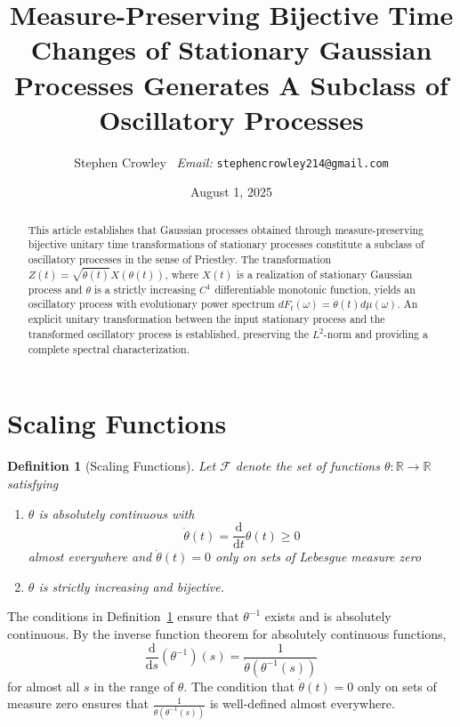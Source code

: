 \documentclass{article}
\newcommand{\mathd}{\mathrm{d}}
\newcommand{\tmemail}[1]{\ \textit{Email:} \texttt{#1}}
\newtheorem{definition}{Definition}
\begin{document}
\title{Measure-Preserving Bijective Time Changes of Stationary Gaussian Processes Generates A Subclass of Oscillatory Processes}
\author{
Stephen Crowley
\tmemail{stephencrowley214@gmail.com}}
\date{August 1, 2025}
\maketitle

\begin{abstract}
This article establishes that Gaussian processes obtained through
measure-preserving bijective unitary time transformations of stationary
processes constitute a subclass of oscillatory processes in the sense of
Priestley{\cite{priestley1965}}. The transformation $Z (t) = \sqrt{\dot{\theta} (t)} X (\theta
(t))$, where $X (t)$ is a realization of stationary Gaussian process and
$\theta$ is a strictly increasing $C^1$ differentiable monotonic function,
yields an oscillatory process with evolutionary power spectrum $dF_t
(\omega) = \dot{\theta} (t) d \mu (\omega)$. An explicit unitary
transformation between the input stationary process and the transformed
oscillatory process is established, preserving the $L^2$-norm and providing
a complete spectral characterization.
\end{abstract}

{\tableofcontents}

\section{Scaling Functions}\label{sec:scaling}

\begin{definition}
[Scaling Functions]\label{def:scaling} Let $\mathcal{F}$ denote the set of
functions $\theta : \mathbb{R} \to \mathbb{R}$ satisfying
\begin{enumerate}
\item $\theta$ is absolutely continuous with
\begin{equation}
\dot{\theta} (t) = \frac{\mathd}{\mathd t} \theta (t) \geq 0
\end{equation}
almost everywhere and $\dot{\theta} (t) = 0$ only on sets of Lebesgue
measure zero
\item $\theta$ is strictly increasing and bijective.
\end{enumerate}
\end{definition}

\begin{remark}
\label{rem:inverse_properties}The conditions in Definition~\ref{def:scaling}
ensure that $\theta^{- 1}$ exists and is absolutely continuous. By the
inverse function theorem for absolutely continuous functions,
\begin{equation}
\frac{\mathd}{\mathd s} (\theta^{- 1}) (s) = \frac{1}{\dot{\theta}
(\theta^{- 1} (s))}
\end{equation}
for almost all $s$ in the range of $\theta$. The condition that
$\dot{\theta} (t) = 0$ only on sets of measure zero ensures that
$\frac{1}{\dot{\theta} (\theta^{- 1} (s))}$ is well-defined almost
everywhere.
\end{remark}
\end{document}
